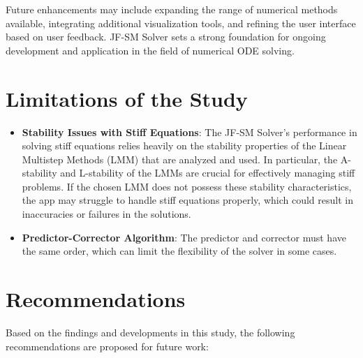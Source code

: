 Future enhancements may include expanding the range of numerical methods available, integrating additional visualization tools, and refining the user interface based on user feedback. JF-SM Solver sets a strong foundation for ongoing development and application in the field of numerical ODE solving.


\section{Limitations of the Study}
\begin{itemize}
  \item \textbf{Stability Issues with Stiff Equations}: The JF-SM Solver's performance in solving stiff equations relies heavily on the stability properties of the Linear Multistep Methods (LMM) that are analyzed and used. In particular, the A-stability and L-stability of the LMMs are crucial for effectively managing stiff problems. If the chosen LMM does not possess these stability characteristics, the app may struggle to handle stiff equations properly, which could result in inaccuracies or failures in the solutions.
  \item \textbf{Predictor-Corrector Algorithm}: The predictor and corrector must have the same order, which can limit the flexibility of the solver in some cases.
\end{itemize}



\section{Recommendations}

Based on the findings and developments in this study, the following recommendations are proposed for future work:

